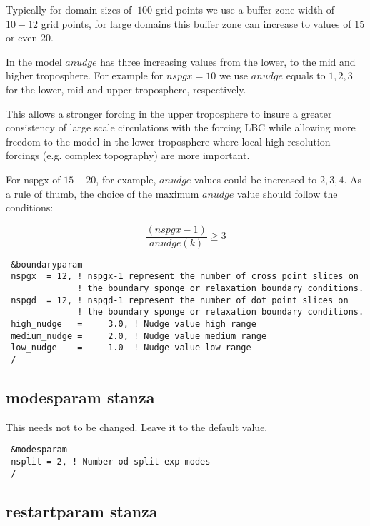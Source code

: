 Typically for domain sizes of $~100$ grid points we use a buffer zone width
of $10-12$ grid points, for large domains this buffer zone can increase to
values of $15$ or even $20$.

In the model $anudge$ has three increasing values from the lower, to the mid
and higher troposphere. For example for $nspgx = 10$ we use $anudge$ equals to
$1, 2, 3$ for the lower, mid and upper troposphere, respectively.

This allows a stronger forcing in the upper troposphere to insure a greater
consistency of large scale circulations with the forcing LBC while allowing
more freedom to the model in the lower troposphere where local high resolution
forcings (e.g. complex topography) are more important.

For nspgx of $15-20$, for example, $anudge$ values could be increased to
$2,3,4$. As a rule of thumb, the choice of the maximum $anudge$ value should
follow the conditions:

\begin{equation}
\frac{(nspgx-1)}{anudge(k)} \ge 3
\end{equation}

{\footnotesize
\begin{Verbatim}
 &boundaryparam
 nspgx  = 12, ! nspgx-1 represent the number of cross point slices on
              ! the boundary sponge or relaxation boundary conditions.
 nspgd  = 12, ! nspgd-1 represent the number of dot point slices on
              ! the boundary sponge or relaxation boundary conditions.
 high_nudge   =     3.0, ! Nudge value high range
 medium_nudge =     2.0, ! Nudge value medium range
 low_nudge    =     1.0  ! Nudge value low range
 /
\end{Verbatim}
}

\subsection{modesparam stanza}

This needs not to be changed. Leave it to the default value.

{\footnotesize
\begin{Verbatim}
 &modesparam
 nsplit = 2, ! Number od split exp modes
 /
\end{Verbatim}
}

\subsection{restartparam stanza}

